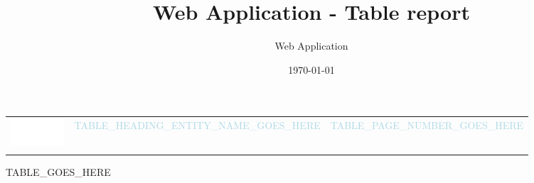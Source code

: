\documentclass{article}
\title{Web Application - Table report}
\author{Web Application}
\date{\today}
\begin{document}
\pagestyle{fancyplain}
\fancyhf{}
\rhead{ \fancyplain{}{\today} }
\rfoot{ \fancyplain{}{\thepage} }

\sffamily

\noindent

\begin{longtable}{ L{20mm} C{110mm} C{30mm} }
  \textcolor{white}{\includegraphics[width=20mm]{logo}} &
  \textcolor{lightblue}{\Huge{TABLE_HEADING_ENTITY_NAME_GOES_HERE}} &
  \textcolor{lightblue}{TABLE_PAGE_NUMBER_GOES_HERE} \\
   &  & \\
\end{longtable}

TABLE_GOES_HERE
\end{document}
